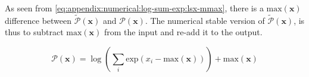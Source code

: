 As seen from \eqref{eq:appendix:numerical:log-sum-exp:lsx-mmax}, there is a $\mathrm{max}(\mathbf{x})$ difference between $\tilde{\mathcal{P}}(\mathbf{x})$ and $\mathcal{P}(\mathbf{x})$. The numerical stable version of $\tilde{\mathcal{P}}(\mathbf{x})$, is thus to subtract $\mathrm{max}(\mathbf{x})$ from the input and re-add it to the output.

\begin{equation}
\mathcal{P}(\mathbf{x}) = \log\left(\sum_i \mathrm{exp}(x_i - \mathrm{max}(\mathbf{x}))\right) + \mathrm{max}(\mathbf{x})
\end{equation}

